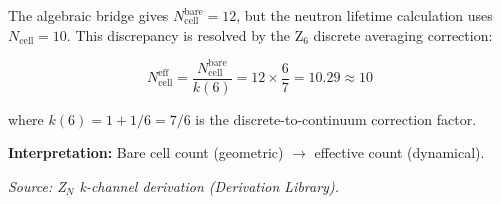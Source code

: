 
\begin{tcolorbox}[colback=blue!5!white, colframe=blue!50!black,
                  title=\textbf{Cell-Count Renormalization (Z$_6$)}]

The algebraic bridge gives $N_{\text{cell}}^{\text{bare}} = 12$, but
the neutron lifetime calculation uses $N_{\text{cell}} = 10$.
This discrepancy is resolved by the Z$_6$ discrete averaging correction:

\begin{equation}
N_{\text{cell}}^{\text{eff}} = \frac{N_{\text{cell}}^{\text{bare}}}{k(6)}
= 12 \times \frac{6}{7} = 10.29 \approx 10
\end{equation}

where $k(6) = 1 + 1/6 = 7/6$ is the discrete-to-continuum correction factor.

\textbf{Interpretation:} Bare cell count (geometric) $\to$ effective count (dynamical).

\vspace{0.5em}
\textit{Source: Z$_N$ k-channel derivation (Derivation Library).}

\end{tcolorbox}
